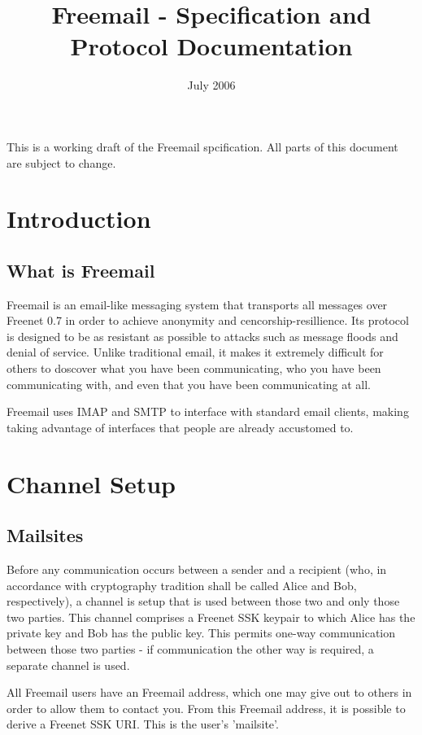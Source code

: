 \documentclass[12pt,a4paper]{article}
\begin{document}
\title{Freemail - Specification and Protocol Documentation}
\date{July 2006}
\maketitle

This is a working draft of the Freemail spcification. All parts of this document are subject to change.

\section{Introduction}
\subsection{What is Freemail}
Freemail is an email-like messaging system that transports all messages over Freenet 0.7 in order to achieve anonymity and cencorship-resillience. Its protocol is designed to be as resistant as possible to attacks such as message floods and denial of service. Unlike traditional email, it makes it extremely difficult for others to doscover what you have been communicating, who you have been communicating with, and even that you have been communicating at all.

Freemail uses IMAP and SMTP to interface with standard email clients, making taking advantage of interfaces that people are already accustomed to.

\section{Channel Setup}
\subsection{Mailsites}
Before any communication occurs between a sender and a recipient (who, in accordance with cryptography tradition shall be called Alice and Bob, respectively), a channel is setup that is used between those two and only those two parties. This channel comprises a Freenet SSK keypair to which Alice has the private key and Bob has the public key. This permits one-way communication between those two parties - if communication the other way is required, a separate channel is used.

All Freemail users have an Freemail address, which one may give out to others in order to allow them to contact you. From this Freemail address, it is possible to derive a Freenet SSK URI. This is the user's 'mailsite'.
\end{document}
